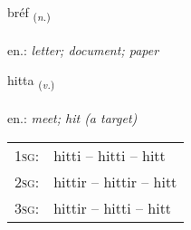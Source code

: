 \documentclass[frontgrid, backgrid]{flacards}\usepackage[]{graphicx}\usepackage[]{xcolor}
\begin{document}
\renewcommand{\blhead}{\vskip5pt {\small\bfseries\footnotesize Nafnorð | Noun }}
\renewcommand{\bcfoot}{\vskip5pt \hspace{2pt}{\small\bfseries\footnotesize 1K}}


{bréf \small{\textsubscript{(\textit{n.})}} \\[1ex] %
\textphonetic{[prjɛːv]} \\
en.: \emph{letter; document; paper} \\  [2ex]
\renewcommand*{\arraystretch}{0.8}
}

\renewcommand{\flhead}{\vskip5pt \fboxsep=0pt {\small\bfseries\footnotesize Sagnorð | Verb}}
\renewcommand{\fcfoot}{\vskip5pt \fboxsep=0pt \hspace{2pt}{\small\bfseries\footnotesize 1K}}

\renewcommand{\blhead}{\vskip5pt {\small\bfseries\footnotesize Sagnorð | Verb }}
\renewcommand{\bcfoot}{\vskip5pt \hspace{2pt}{\small\bfseries\footnotesize 1K}}


{hitta \small{\textsubscript{(\textit{v.})}} \\[1ex] %
\textphonetic{[hɪhta]} \\
en.: \emph{meet; hit (a target)} \\  [2ex]
\renewcommand*{\arraystretch}{0.8}
\begin{tabular}{p{1cm}l}
\textsc{1sg}: & hitti -- hitti -- hitt \\ 
\textsc{2sg}: & hittir -- hittir -- hitt \\ 
\textsc{3sg}: & hittir -- hitti -- hitt \\ 
\end{tabular}
}

\renewcommand{\flhead}{\vskip5pt \fboxsep=0pt {\small\bfseries\footnotesize Sagnorð | Verb}}
\renewcommand{\fcfoot}{\vskip5pt \fboxsep=0pt \hspace{2pt}{\small\bfseries\footnotesize 1K}}
\end{document}
